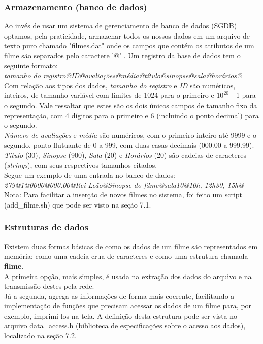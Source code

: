 \documentclass[11pt,twoside]{article}
\begin{document}
\subsubsection{Armazenamento (banco de dados)}
Ao invés de usar um sistema de gerenciamento de banco de dados (SGDB) optamos, pela praticidade, armazenar todos os nossos dados em um arquivo de texto puro chamado "filmes.dat" onde os campos que contém os atributos de um filme são separados pelo caractere '@' . Um registro da base de dados tem o seguinte formato:\\
\textit{tamanho do registro@ID@avaliações@média@título@sinopse@sala@horários@}\\
Com relação aos tipos dos dados, \textit{tamanho do registro} e \textit{ID} são numéricos, inteiros, de tamanho variável com limites de 1024 para o primeiro e $10^{20}$ - 1 para o segundo. Vale ressaltar que estes são os dois únicos campos de tamanho fixo da representação, com 4 dígitos para o primeiro e 6 (incluindo o ponto decimal) para o segundo.\\
\textit{Número de avaliações} e \textit{média} são numéricos, com o primeiro inteiro até 9999 e o segundo, ponto flutuante de 0 a 999, com duas casas decimais (000.00 a 999.99).\\
\textit{Título} (30), \textit{Sinopse} (900), \textit{Sala} (20) e \textit{Horários} (20) são cadeias de caracteres (\textit{strings}), com seus respectivos tamanhos citados.\\
Segue um exemplo de uma entrada no banco de dados:\\
\textit{279@1@0000@000.00@Rei Leão@Sinopse do filme@sala10@10h, 12h30, 15h@}\\
Nota: Para facilitar a inserção de novos filmes no sistema, foi feito um script (add\_filme.sh) que pode ser visto na seção 7.1.
\subsubsection{Estruturas de dados}
Existem duas formas básicas de como os dados de um filme são representados em memória: como uma cadeia crua de caracteres e como uma estrutura chamada \textbf{filme}.\\
A primeira opção, mais simples, é usada na extração dos dados do arquivo e na transmissão destes pela rede.\\
Já a segunda, agrega as informações de forma mais coerente, facilitando a implementação de funções que precisam acessar os dados de um filme para, por exemplo, imprimi-los na tela. A definição desta estrutura pode ser vista no arquivo data\_access.h (biblioteca de especificações sobre o acesso aos dados), localizado na seção 7.2.\\
\end{document}
